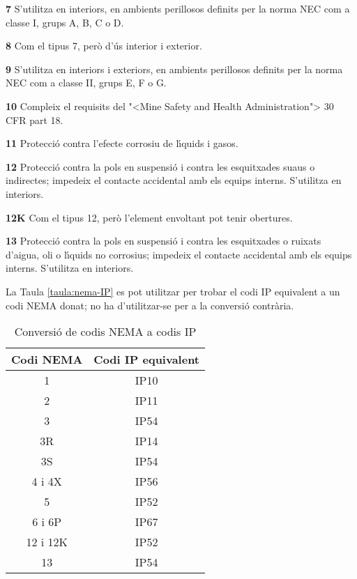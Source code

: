 \begin{list}{}
   \item[\textbf{7}] S'utilitza en interiors, en ambients perillosos definits per la norma \textsf{NEC} com a classe I, grups A, B, C o D.
   \item[\textbf{8}] Com el tipus 7, per\`{o} d'\'{u}s interior i exterior.
   \item[\textbf{9}] S'utilitza en interiors i exteriors, en ambients perillosos definits per la norma \textsf{NEC} com a classe II, grups E, F o G.
   \item[\textbf{10}] Compleix el requisits del {"<}Mine Safety and Health Administration{">} 30 CFR part 18.
   \item[\textbf{11}] Protecci\'{o} contra l'efecte corrosiu de l\'{\i}quids i gasos.
   \item[\textbf{12}] Protecci\'{o} contra la pols en suspensi\'{o} i contra les esquitxades suaus o indirectes; impedeix el contacte accidental amb els equips interns. S'utilitza en interiors.
   \item[\textbf{12K}] Com el tipus 12, per\`{o} l'element envoltant pot tenir obertures.
   \item[\textbf{13}] Protecci\'{o} contra la pols en suspensi\'{o} i contra les esquitxades o ruixats d'aigua, oli o l\'{\i}quids no corrosius; impedeix el contacte accidental amb els equips interns. S'utilitza en interiors.
\end{list}


La Taula \vref{taula:nema-IP} es pot utilitzar per trobar el codi \textsf{IP} equivalent a un codi \textsf{NEMA} donat; no ha d'utilitzar-se per a la conversi\'{o} contr\`{a}ria.
\begin{table}[htb]
   \caption{\label{taula:nema-IP} Conversi\'{o} de codis \textsf{NEMA} a codis \textsf{IP}}
   \begin{center}\begin{tabular}{cc}
   \toprule[1pt]
   Codi \textsf{NEMA} & Codi \textsf{IP} equivalent \\
   \midrule
   1 & \textsf{IP}10 \\
   2 & \textsf{IP}11 \\
   3 & \textsf{IP}54 \\
   3R & \textsf{IP}14 \\
   3S & \textsf{IP}54 \\
   4 i 4X & \textsf{IP}56 \\
   5 & \textsf{IP}52 \\
   6 i 6P & \textsf{IP}67\\
   12 i 12K & \textsf{IP}52 \\
   13 & \textsf{IP}54 \\
   \bottomrule[1pt]
   \end{tabular} \end{center}
\end{table}



